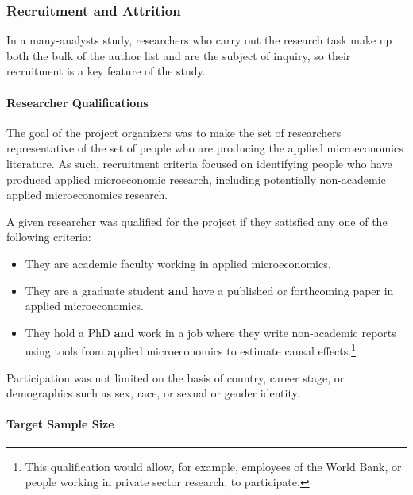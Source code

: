 \documentclass[
  letterpaper,
  DIV=11,
  numbers=noendperiod]{scrartcl}
\let\oldparagraph\paragraph
\renewcommand{\paragraph}[1]{\oldparagraph{#1}\mbox{}}
\begin{document}
\hypertarget{recruitment-and-attrition}{%
\subsubsection{Recruitment and
Attrition}\label{recruitment-and-attrition}}

In a many-analysts study, researchers who carry out the research task
make up both the bulk of the author list and are the subject of inquiry,
so their recruitment is a key feature of the study.

\hypertarget{researcher-qualifications}{%
\paragraph{Researcher Qualifications}\label{researcher-qualifications}}

The goal of the project organizers was to make the set of researchers
representative of the set of people who are producing the applied
microeconomics literature. As such, recruitment criteria focused on
identifying people who have produced applied microeconomic research,
including potentially non-academic applied microeconomics research.

A given researcher was qualified for the project if they satisfied any
one of the following criteria:

\begin{itemize}
\item
  They are academic faculty working in applied microeconomics.
\item
  They are a graduate student \textbf{and} have a published or
  forthcoming paper in applied microeconomics.
\item
  They hold a PhD \textbf{and} work in a job where they write
  non-academic reports using tools from applied microeconomics to
  estimate causal effects.\footnote{This qualification would allow, for
    example, employees of the World Bank, or people working in private
    sector research, to participate.}
\end{itemize}

Participation was not limited on the basis of country, career stage, or
demographics such as sex, race, or sexual or gender identity.

\hypertarget{target-sample-size}{%
\paragraph{Target Sample Size}\label{target-sample-size}}
\end{document}
